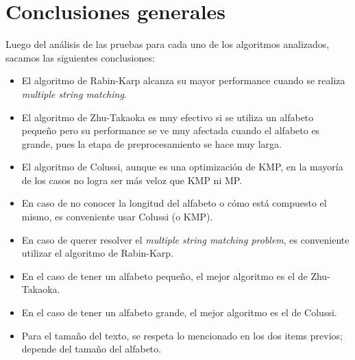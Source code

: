 \documentclass[a4paper, 10pt]{article}
\begin{document}
	\section{Conclusiones generales}
		Luego del análisis de las pruebas para cada uno de los algoritmos analizados, sacamos las siguientes conclusiones:
		\begin{itemize}
			\item El algoritmo de Rabin-Karp alcanza su mayor performance cuando se realiza \emph{multiple string matching}.
			\item El algoritmo de Zhu-Takaoka es muy efectivo si se utiliza un alfabeto pequeño pero su performance se ve muy
			afectada cuando el alfabeto es grande, pues la etapa de preprocesamiento se hace muy larga.
			\item El algoritmo de Colussi, aunque es una optimización de KMP, en la mayoría de los casos no logra ser más veloz que
			KMP ni MP.
			\item En caso de no conocer la longitud del alfabeto o cómo está compuesto el mismo, es conveniente usar Colussi (o KMP).
			\item En caso de querer resolver el \emph{multiple string matching problem}, es conveniente utilizar el algoritmo de
			Rabin-Karp.
			\item En el caso de tener un alfabeto pequeño, el mejor algoritmo es el de Zhu-Takaoka.
			\item En el caso de tener un alfabeto grande, el mejor algoritmo es el de Colussi.
			\item Para el tamaño del texto, se respeta lo mencionado en los dos items previos; depende del tamaño del alfabeto.
			
		\end{itemize}
		
\end{document}
